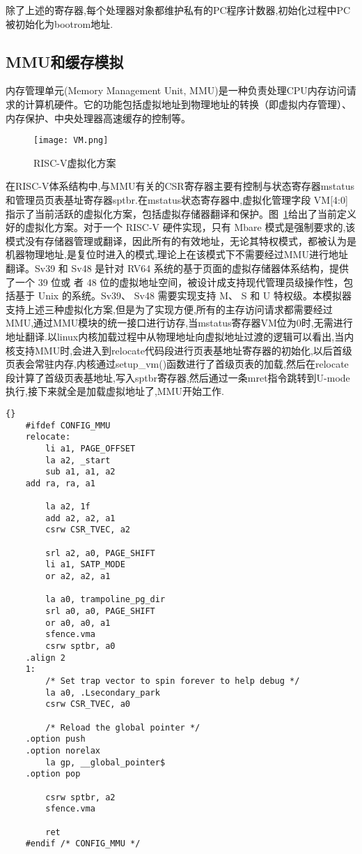 除了上述的寄存器,每个处理器对象都维护私有的PC程序计数器,初始化过程中PC被初始化为bootrom地址.

\subsection{MMU和缓存模拟}

内存管理单元(Memory Management Unit, MMU)是一种负责处理CPU内存访问请求的计算机硬件。它的功能包括虚拟地址到物理地址的转换（即虚拟内存管理）、内存保护、中央处理器高速缓存的控制等。
\begin{figure}[h]
    \centering
    \texttt{[image: VM.png]}
    \caption{RISC-V虚拟化方案}
    \label{fig:VM}
\end{figure}

在RISC-V体系结构中,与MMU有关的CSR寄存器主要有控制与状态寄存器mstatus和管理员页表基址寄存器sptbr.在mstatus状态寄存器中,虚拟化管理字段 VM[4:0]指示了当前活跃的虚拟化方案，包括虚拟存储器翻译和保护。图~\ref{fig:VM}给出了当前定义好的虚拟化方案。对于一个 RISC-V 硬件实现，只有 Mbare 模式是强制要求的,该模式没有存储器管理或翻译，因此所有的有效地址，无论其特权模式，都被认为是机器物理地址,是复位时进入的模式,理论上在该模式下不需要经过MMU进行地址翻译。Sv39 和 Sv48 是针对 RV64 系统的基于页面的虚拟存储器体系结构，提供了一个 39 位或 者 48 位的虚拟地址空间，被设计成支持现代管理员级操作性，包括基于 Unix 的系统。Sv39、 Sv48 需要实现支持 M、 S 和 U 特权级。本模拟器支持上述三种虚拟化方案,但是为了实现方便,所有的主存访问请求都需要经过MMU,通过MMU模块的统一接口进行访存,当mstatus寄存器VM位为0时,无需进行地址翻译.以linux内核加载过程中从物理地址向虚拟地址过渡的逻辑可以看出,当内核支持MMU时,会进入到relocate代码段进行页表基地址寄存器的初始化,以后首级页表会常驻内存,内核通过setup\_vm()函数进行了首级页表的加载,然后在relocate段计算了首级页表基地址,写入sptbr寄存器,然后通过一条mret指令跳转到U-mode执行,接下来就全是加载虚拟地址了,MMU开始工作.
\begin{lstlisting}{}
    #ifdef CONFIG_MMU
    relocate:
        li a1, PAGE_OFFSET
        la a2, _start
        sub a1, a1, a2
    add ra, ra, a1
    
        la a2, 1f
        add a2, a2, a1
        csrw CSR_TVEC, a2
    
        srl a2, a0, PAGE_SHIFT
        li a1, SATP_MODE
        or a2, a2, a1
    
        la a0, trampoline_pg_dir
        srl a0, a0, PAGE_SHIFT
        or a0, a0, a1
        sfence.vma
        csrw sptbr, a0
    .align 2
    1:
        /* Set trap vector to spin forever to help debug */
        la a0, .Lsecondary_park
        csrw CSR_TVEC, a0
    
        /* Reload the global pointer */
    .option push
    .option norelax
        la gp, __global_pointer$
    .option pop
    
        csrw sptbr, a2
        sfence.vma
    
        ret
    #endif /* CONFIG_MMU */    
\end{lstlisting}



